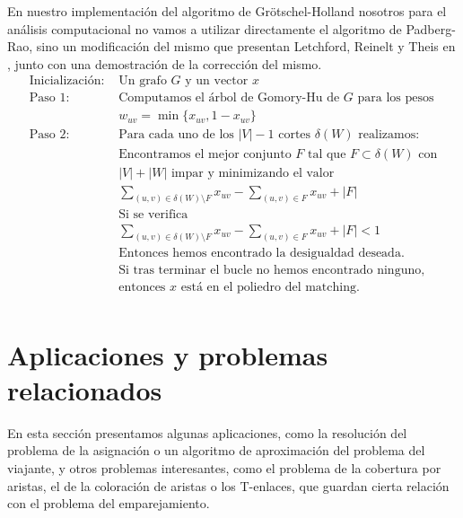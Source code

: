 \documentclass[twoside,a4paper,openright,12pt,tikz]{book}
\begin{document}
En nuestro implementación del algoritmo de Grötschel-Holland nosotros para el análisis computacional no vamos a utilizar directamente el algoritmo de Padberg-Rao, sino un modificación del mismo que presentan Letchford, Reinelt y Theis en \cite{adam}, junto con una demostración de la corrección del mismo.
\begin{align*}
\text{Inicialización: }&\text{Un grafo $G$ y un vector $x$}\\
\text{Paso 1: }&\text{Computamos el árbol de Gomory-Hu de $G$ para los pesos}\\
& w_{uv} = \min\{x_{uv},1-x_{uv}\}\\
\text{Paso 2: }&\text{Para cada uno de los $|V|-1$ cortes $\delta(W)$ realizamos:}\\
&\text{Encontramos el mejor conjunto $F$ tal que $F\subset \delta(W)$ con}\\
&\text{$|V|+|W|$ impar y minimizando el valor}\\
&\sum_{(u,v)\in \delta(W)\setminus F}x_{uv} - \sum_{(u,v)\in F}x_{uv} + |F|\\
&\text{Si se verifica}\\
&\sum_{(u,v)\in \delta(W)\setminus F}x_{uv} - \sum_{(u,v)\in F}x_{uv} +|F|<1\\
& \text{Entonces hemos encontrado la desigualdad deseada.}\\
&\text{Si tras terminar el bucle no hemos encontrado ninguno,}\\
&\text{entonces $x$ está en el poliedro del matching.}\\
\end{align*}


\section{Aplicaciones y problemas relacionados}
En esta sección presentamos algunas aplicaciones, como la resolución del problema de la asignación o un algoritmo de aproximación del problema del viajante, y otros problemas interesantes, como el problema de la cobertura por aristas, el de la coloración de aristas o los T-enlaces, que guardan cierta relación con el problema del emparejamiento.
\end{document}
